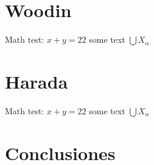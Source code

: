 \documentclass{beamer}
\begin{document}
\section{Woodin}

\begin{frame}
    Math test: $x+y = 22$ some text $\bigcup X_{\alpha}$
\end{frame}

\section{Harada}

\begin{frame}
    Math test: $x+y = 22$ some text $\bigcup X_{\alpha}$
\end{frame}

\section{Conclusiones}
\end{document}
